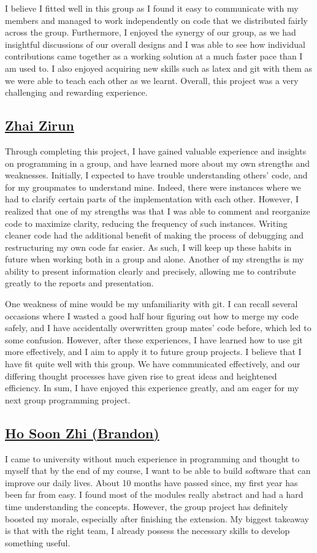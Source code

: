 \documentclass[11pt]{article}
\begin{document}
I believe I fitted well in this group as I found it easy to communicate with my members and managed to work independently on code that we distributed fairly across the group. Furthermore, I enjoyed the synergy of our group, as we had insightful discussions of our overall designs and I was able to see how individual contributions came together as a working solution at a much faster pace than I am used to. I also enjoyed acquiring new skills such as latex and git with them as we were able to teach each other as we learnt. Overall, this project was a very challenging and rewarding experience.

\subsection*{\underline{Zhai Zirun}}
Through completing this project, I have gained valuable experience and insights on programming in a group, and have learned more about my own strengths and weaknesses.
Initially, I expected to have trouble understanding others’ code, and for my groupmates to understand mine. Indeed, there were instances where we had to clarify certain parts of the implementation with each other. However, I realized that one of my strengths was that I was able to comment and reorganize code to maximize clarity, reducing the frequency of such instances. Writing cleaner code had the additional benefit of making the process of debugging and restructuring my own code far easier. As such, I will keep up these habits in future when working both in a group and alone. Another of my strengths is my ability to present information clearly and precisely, allowing me to contribute greatly to the reports and presentation. 

One weakness of mine would be my unfamiliarity with git. I can recall several occasions where I wasted a good half hour figuring out how to merge my code safely, and I have accidentally overwritten group mates’ code before, which led to some confusion. However, after these experiences, I have learned how to use git more effectively, and I aim to apply it to future group projects.
I believe that I have fit quite well with this group. We have communicated effectively, and our differing thought processes have given rise to great ideas and heightened efficiency. In sum, I have enjoyed this experience greatly, and am eager for my next group programming project. 

\subsection*{\underline{Ho Soon Zhi (Brandon)}}
I came to university without much experience in programming and thought to myself that by the end of my course, I want to be able to build software that can improve our daily lives. About 10 months have passed since, my first year has been far from easy. I found most of the modules really abstract and had a hard time understanding the concepts. However, the group project has definitely boosted my morale, especially after finishing the extension. My biggest takeaway is that with the right team, I already possess the necessary skills to develop something useful.
\end{document}
